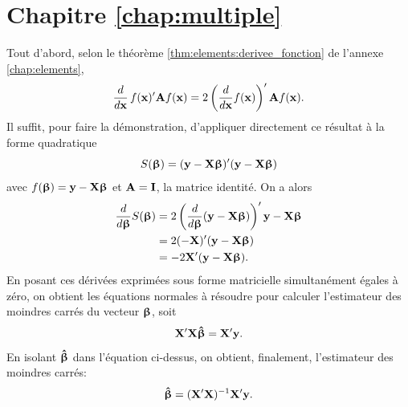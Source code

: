 \section*{Chapitre \ref{chap:multiple}}

\begin{solution}{3.1}
    Tout d'abord, selon le théorème
    \ref{thm:elements:derivee_fonction} de l'annexe
    \ref{chap:elements},
    \begin{displaymath}
      \frac{d}{d \mathbf{x}}\, f(\mathbf{x})^\prime \mathbf{A} f(\mathbf{x}) =
      2 \left( \frac{d}{d \mathbf{x}} f(\mathbf{x}) \right)^\prime \mathbf{A} f(\mathbf{x}).
    \end{displaymath}
    Il suffit, pour faire la démonstration, d'appliquer directement ce
    résultat à la forme quadratique
    \begin{displaymath}
      S(\boldsymbol{\upbeta}) = (\mathbf{y} - \mathbf{X} \boldsymbol{\upbeta})^\prime (\mathbf{y} - \mathbf{X} \boldsymbol{\upbeta})
    \end{displaymath}
    avec $f(\boldsymbol{\upbeta}) = \mathbf{y} - \mathbf{X} \boldsymbol{\upbeta}$ et $\mathbf{A} =
    \mathbf{I}$, la matrice identité. On a alors
    \begin{align*}
      \frac{d}{d\boldsymbol{\upbeta}} S(\boldsymbol{\upbeta})
      &= 2
      \left(
        \frac{d}{d\boldsymbol{\upbeta}} (\mathbf{y} - \mathbf{X} \boldsymbol{\upbeta})
      \right)^\prime
      \mathbf{y} - \mathbf{X} \boldsymbol{\upbeta} \\
      &= 2 (-\mathbf{X})^\prime (\mathbf{y} - \mathbf{X} \boldsymbol{\upbeta})\\
      &= -2 \mathbf{X}^\prime (\mathbf{y} - \mathbf{X} \boldsymbol{\upbeta}).
    \end{align*}
    En posant ces dérivées exprimées sous forme matricielle
    simultanément égales à zéro, on obtient les équations normales à
    résoudre pour calculer l'estimateur des moindres carrés du vecteur
    $\boldsymbol{\upbeta}$, soit
    \begin{displaymath}
      \mathbf{X}^\prime \mathbf{X} \boldsymbol{\hat{\upbeta}} = \mathbf{X}^\prime \mathbf{y}.
    \end{displaymath}
    En isolant $\boldsymbol{\hat{\upbeta}}$ dans l'équation ci-dessus, on obtient,
    finalement, l'estimateur des moindres carrés:
    \begin{displaymath}
      \boldsymbol{\hat{\upbeta}} = (\mathbf{X}^\prime \mathbf{X})^{-1} \mathbf{X}^\prime \mathbf{y}.
    \end{displaymath}
  
\end{solution}
